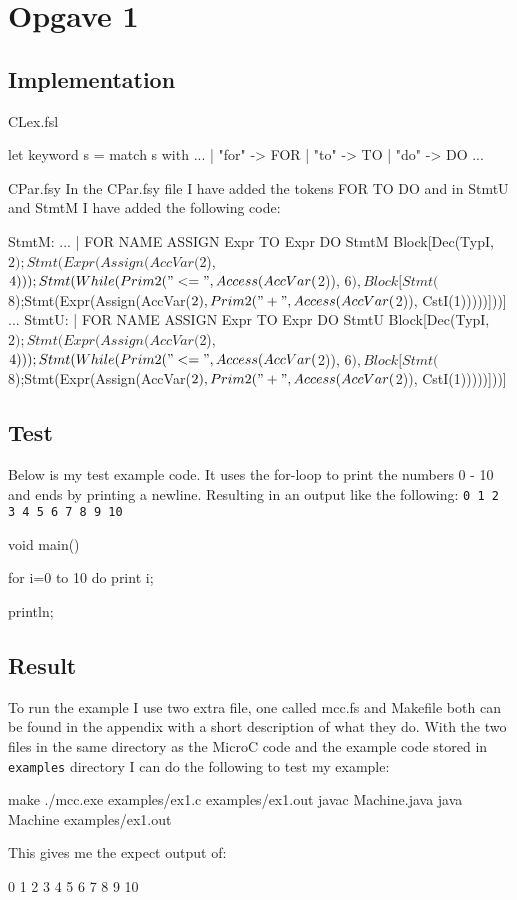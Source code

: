 \section{Opgave 1}
\subsection{Implementation}
CLex.fsl
\begin{fs}
let keyword s =
    match s with
    ...
    | "for"     -> FOR
    | "to"      -> TO
    | "do"      -> DO
    ...
\end{fs}
CPar.fsy
In the CPar.fsy file I have added the tokens FOR TO DO and in StmtU and StmtM I
have added the following code:
\begin{fs}
StmtM:
...
  | FOR NAME ASSIGN Expr TO Expr DO StmtM { Block[Dec(TypI, $2); Stmt(Expr(Assign(AccVar($2), $4))); Stmt(While(Prim2("<=", Access(AccVar($2)), $6), Block[Stmt($8);Stmt(Expr(Assign(AccVar($2), Prim2("+", Access(AccVar($2)), CstI(1)))))]))] }
...
StmtU:
  | FOR NAME ASSIGN Expr TO Expr DO StmtU { Block[Dec(TypI, $2); Stmt(Expr(Assign(AccVar($2), $4))); Stmt(While(Prim2("<=", Access(AccVar($2)), $6), Block[Stmt($8);Stmt(Expr(Assign(AccVar($2), Prim2("+", Access(AccVar($2)), CstI(1)))))]))] }
\end{fs}
\subsection{Test}
Below is my test example code. It uses the for-loop to print the numbers 0 - 10
and ends by printing a newline. Resulting in an output like the following:
\texttt{0 1 2 3 4 5 6 7 8 9 10}
\begin{ccode}
void main() {
  for i=0 to 10 do 
    print i;

  println;
}
\end{ccode}
\subsection{Result}
To run the example I use two extra file, one called mcc.fs and Makefile both can
be found in the appendix with a short description of what they do. With the two
files in the same directory as the MicroC code and the example code stored in
\texttt{examples} directory I can do the following to test my example:
\begin{bashcode}
make
./mcc.exe examples/ex1.c examples/ex1.out
javac Machine.java
java Machine examples/ex1.out
\end{bashcode}
This gives me the expect output of:
\begin{bashcode}
0 1 2 3 4 5 6 7 8 9 10

\end{bashcode}

